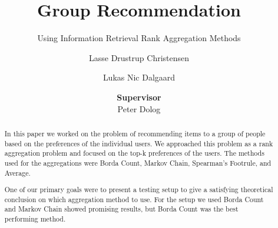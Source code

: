 \documentclass[sigplan]{acmart}
\begin{document}
\linenumbers
\title{Group Recommendation}
\subtitle{Using Information Retrieval Rank Aggregation Methods}

\author{Lasse Drustrup Christensen}

\author{Lukas Nic Dalgaard}

\author{\textbf{Supervisor}\\ Peter Dolog}



\begin{abstract}
In this paper we worked on the problem of recommending items to a group of people based on the preferences of the individual users. We approached this problem as a rank aggregation problem and focused on the top-k preferences of the users.
The methods used for the aggregations were Borda Count, Markov Chain, Spearman's Footrule, and Average.

One of our primary goals were to present a testing setup to give a satisfying theoretical conclusion on which aggregation method to use. For the setup we used Borda Count and Markov Chain showed promising results, but Borda Count was the best performing method.
\end{abstract}



\maketitle










 

\newpage


\end{document}
